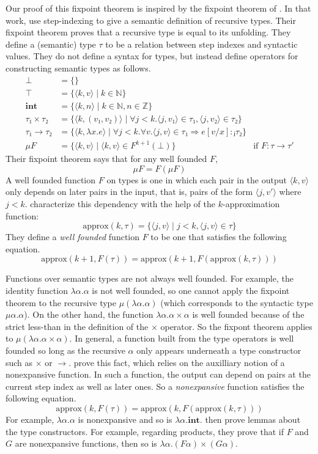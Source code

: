 \documentclass[acmsmall]{acmart}
\newcommand{\kapprox}{\mathrm{approx}}
\begin{document}
Our proof of this fixpoint theorem is inspired by the fixpoint theorem
of \citet{Appel:2001aa}. In that work, \citet{Appel:2001aa} use
step-indexing to give a semantic definition of recursive types. Their
fixpoint theorem proves that a recursive type is equal to its unfolding.
They define a (semantic) type $\tau$ to be a relation between step indexes and
syntactic values. They do not define a syntax for types, but instead
define operators for constructing semantic types as follows.
\begin{align*}
  ⊥ &= \{ \} \\
  ⊤ &= \{ ⟨k,v⟩ \mid k ∈ ℕ\} \\
  \mathbf{int} &= \{⟨k,n⟩ \mid k ∈ ℕ, n ∈ ℤ \}\\
  τ₁ × τ₂ &= \{ ⟨k,(v₁,v₂)⟩ \mid ∀j<k. ⟨j,v₁⟩∈τ₁, ⟨j,v₂⟩∈τ₂ \} \\
  τ₁ → τ₂ &= \{ ⟨k,λx.e⟩ \mid ∀j<k.∀v. ⟨j,v⟩∈τ₁ ⇒ e[v/x] :ⱼ τ₂ \} \\
  μ F &= \{ ⟨k,v⟩ \mid ⟨k,v⟩ ∈ F^{k\plus 1}(⊥) \}
    & \text{if } F : \tau \to \tau'
\end{align*}
Their fixpoint theorem says that for any well founded $F$,
\[
  μ F = F(μF)
\]
A well founded function $F$ on types is
one in which each pair in the output $⟨k,v⟩$ only depends
on later pairs in the input, that is, pairs of the form $⟨j,v′⟩$
where $j < k$. \citet{Appel:2001aa} characterize this dependency
with the help of the $k$-approximation function:
\[
  \kapprox(k,τ) = \{ ⟨j,v⟩ \mid j < k, ⟨j,v⟩ ∈ τ\} 
\]
They define a \emph{well founded} function $F$ to be one that
satisfies the following equation.
\[
  \kapprox(k \plus 1, F(τ)) = \kapprox(k \plus 1, F(\kapprox(k,τ)))
\]

Functions over semantic types are not always well founded.  For
example, the identity function $λα.α$ is not well founded, so one
cannot apply the fixpoint theorem to the recursive type $μ(λα.α)$
(which corresponds to the syntactic type $μα.α$).
On the other hand, the function
$λα.α×α$ is well founded because of the strict less-than in the
definition of the $×$ operator. So the fixpont theorem applies to
$μ(λα.α×α)$.  In general, a function built from the type operators is
well founded so long as the recursive $α$ only appears underneath a
type constructor such as $×$ or $→$. \citet{Appel:2001aa} prove this
fact, which relies on the auxilliary notion of a nonexpansive
function. In such a function, the output can depend on pairs at the
current step index as well as later ones. So a \emph{nonexpansive}
function satisfies the following equation.
\[
  \kapprox(k, F(τ)) = \kapprox(k, F(\kapprox(k,τ)))
\]
For example, $λα.α$ is nonexpansive and so is $λα.\mathbf{int}$.
\citet{Appel:2001aa} then prove lemmas about the type constructors.
For example, regarding products, they prove that if $F$ and $G$
are nonexpansive functions, then so is $λ α. (F α) × (G α)$.
\end{document}
